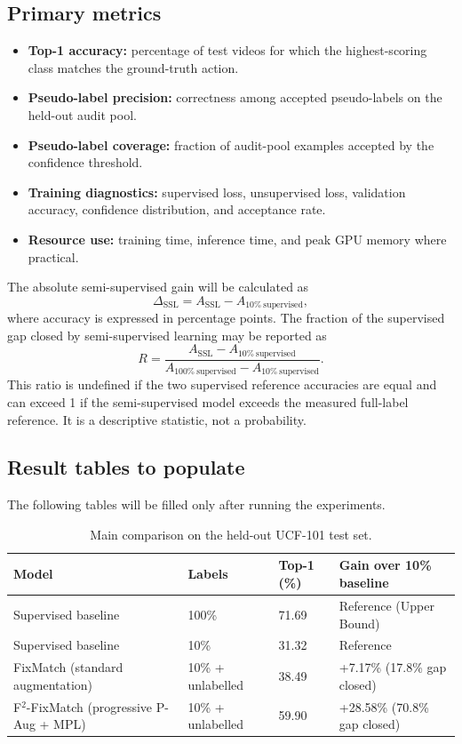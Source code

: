 \documentclass[11pt,a4paper]{article}
\begin{document}
\subsection{Primary metrics}
\begin{itemize}
  \item \textbf{Top-1 accuracy:} percentage of test videos for which the highest-scoring class matches the ground-truth action.
  \item \textbf{Pseudo-label precision:} correctness among accepted pseudo-labels on the held-out audit pool.
  \item \textbf{Pseudo-label coverage:} fraction of audit-pool examples accepted by the confidence threshold.
  \item \textbf{Training diagnostics:} supervised loss, unsupervised loss, validation accuracy, confidence distribution, and acceptance rate.
  \item \textbf{Resource use:} training time, inference time, and peak GPU memory where practical.
\end{itemize}

The absolute semi-supervised gain will be calculated as
\[
\Delta_{\mathrm{SSL}} =
A_{\mathrm{SSL}} - A_{\mathrm{10\%\ supervised}},
\]
where accuracy is expressed in percentage points. The fraction of the supervised gap closed by semi-supervised learning may be reported as
\[
R =
\frac{A_{\mathrm{SSL}}-A_{\mathrm{10\%\ supervised}}}
{A_{\mathrm{100\%\ supervised}}-A_{\mathrm{10\%\ supervised}}}.
\]
This ratio is undefined if the two supervised reference accuracies are equal and can exceed 1 if the semi-supervised model exceeds the measured full-label reference. It is a descriptive statistic, not a probability.

\subsection{Result tables to populate}
The following tables will be filled only after running the experiments.

\begin{table}[H]
\centering
\small
\caption{Main comparison on the held-out UCF-101 test set.}
\begin{tabularx}{\textwidth}{L{4.5cm}L{2.2cm}L{2.0cm}Y}
\toprule
\textbf{Model} & \textbf{Labels} & \textbf{Top-1 (\%)} & \textbf{Gain over 10\% baseline} \\
\midrule
Supervised baseline & 100\% & 71.69 & Reference (Upper Bound) \\
Supervised baseline & 10\% & 31.32 & Reference \\
FixMatch (standard augmentation) & 10\% + unlabelled & 38.49 & +7.17\% (17.8\% gap closed) \\
F$^2$-FixMatch (progressive P-Aug + MPL) & 10\% + unlabelled & 59.90 & +28.58\% (70.8\% gap closed) \\
\bottomrule
\end{tabularx}
\end{table}
\end{document}
